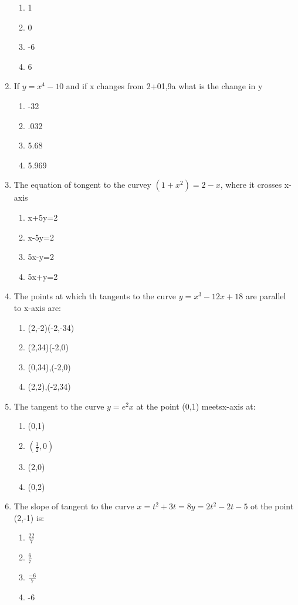 \documentclass[12pt]{article}
\begin{document}
\begin{enumerate}
 \begin{enumerate}
 \item 1
 \item 0
 \item -6
 \item 6
 \end{enumerate}
 \item If $y=x^4-10$ and if x changes from 2+01,9a what is the change in y
 \begin{enumerate}
 \item -32
 \item .032
\item 5.68
\item 5.969
\end{enumerate}
\item The equation of tongent to the curvey $(1+x^2) =2-x$, where it crosses x-axis
\begin{enumerate}
\item x+5y=2
\item x-5y=2
\item 5x-y=2
\item 5x+y=2
\end{enumerate}
\item The points at which th tangents to the curve $y=x^3-12x+18$ are parallel to x-axis are:
\begin{enumerate}
\item (2,-2)(-2,-34)
\item (2,34)(-2,0)
\item (0,34),(-2,0)
\item (2,2),(-2,34)
\end{enumerate}
\item The tangent to the curve $y=e^2x$ at the point (0,1) meetsx-axis at:
\begin{enumerate}
\item (0,1)
\item $(\frac{1}{2},0)$
\item (2,0) 
\item(0,2)
\end{enumerate}
\item The slope of tangent to the curve $x=t^2+3t=8 y=2t^2-2t-5$ ot the point (2,-1) is:
\begin{enumerate}
	\item $\frac{22}{7}$
	\item $\frac{6}{7}$
	\item $\frac{-6}{7}$
\item -6
\end{enumerate}

\end{enumerate}
\end{document}
